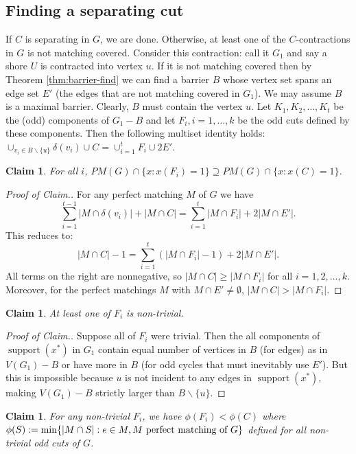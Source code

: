 \documentclass[11pt]{article}
\DeclareMathOperator{\supp}{support}
\newcommand{\1}{\mathbf{1}}
\newcommand{\0}{\mathbf{0}}
\newcounter{claim-nb}[theorem]
\newtheorem{claim}[claim-nb]{Claim}
\newcounter{claim-nbs}[section]
\newenvironment{cproof}
{\begin{proof}
 [Proof of Claim.]
 \vspace{-1.2\parsep}}
{\renewcommand{\qed}{\hfill $\Diamond$} \end{proof}}
\begin{document}
\subsection{Finding a separating cut}
If $C$ is separating in $G$, we are done. Otherwise, at least one of the $C$-contractions in $G$ is not matching covered.
Consider this contraction: call it $G_1$ and say
a shore $U$ is contracted into vertex $u$. If it is not matching covered then by Theorem \ref{thm:barrier-find} we can find a barrier $B$ whose vertex set spans an edge set $E'$ (the edges that are not matching covered in $G_1$).  
We may assume $B$ is a maximal barrier. Clearly, $B$ must contain the vertex $u$. Let $K_1, K_2, \ldots, K_t$ be the (odd) components of $G_1-B$ and let $F_i, i=1,\ldots,k$ be the odd cuts defined by these components. Then the following multiset identity holds: $\cup_{v_i\in B\backslash \{u\}}\delta(v_i) \cup C = \cup_{i=1}^t F_i\cup 2 E'$. 
\begin{claim}
    For all $i$, $PM(G)\cap \{x: x(F_i)=1\}\supseteq PM(G)\cap \{x: x(C)=1\}$.
\end{claim}
\begin{cproof}
    For any perfect matching $M$ of $G$ we have \begin{equation*}
    \sum_{i=1}^{t-1}|M\cap \delta(v_i)|+|M\cap C| =\sum_{i=1}^t|M\cap F_i|+2|M\cap E'|. 
    \end{equation*} This reduces to:\begin{equation*}
    |M\cap C|-1 = \sum_{i=1}^t (|M\cap F_i|-1) + 2|M\cap E'|.
    \end{equation*}
    All terms on the right are nonnegative, so $|M\cap C|\geq |M\cap F_i|$ for all $i=1,2,\ldots, k$. Moreover, for the perfect matchings $M$ with $M\cap E' \neq \emptyset$, $|M\cap C|>|M\cap F_i|$.
\end{cproof}
\begin{claim}
    At least one of $F_i$ is non-trivial.
\end{claim}
\begin{cproof}
    Suppose all of $F_i$ were trivial. Then the all components of $\supp(x^*)$ in $G_1$ contain equal number of vertices in $B$ (for edges) as in $V(G_1)-B$ or have more in $B$ (for odd cycles that must inevitably use $E'$). But this is impossible because $u$ is not incident to any edges in $\supp(x^*)$, making $V(G_1)-B$ strictly larger than $B\backslash \{u\}$.
\end{cproof}
\begin{claim}
    For any non-trivial $F_i$, we have $\phi(F_i)<\phi(C)$ where $\phi(S):=\min \{|M\cap S|: e\in M, M\textmd{ perfect matching of } G\}$ defined for all non-trivial odd cuts of $G$.
\end{claim}
\end{document}
